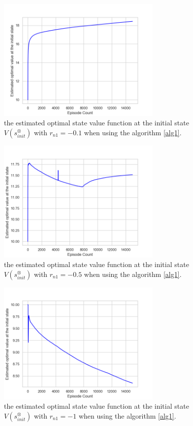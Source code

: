 \documentclass[a4j,12pt,oneside,openany,english,dvipdfmx]{jsbook}
\begin{document}
\begin{figure}[htbp]
   \centering
   \vspace{2mm}
   \includegraphics[width = 8cm]{max_Q_value_TD.png}
   \caption{the estimated optimal state value function at the initial state $V(s^{\otimes}_{init})$ with $r_{n1} = -0.1$ when using the algorithm \ref{alg1}.}
   \label{result1}
\end{figure}

\begin{figure}[htbp]
   \centering
   \vspace{2mm}
   \includegraphics[width = 8cm]{learning_TD_v_15000_5000_rn2_05.png}
   \caption{the estimated optimal state value function at the initial state $V(s^{\otimes}_{init})$ with $r_{n1} = -0.5$ when using the algorithm \ref{alg1}.}
   \label{result1}
\end{figure}

\begin{figure}[htbp]
   \centering
   \vspace{2mm}
   \includegraphics[width = 8cm]{max_Q_value_TD_rn2_1.png}
   \caption{the estimated optimal state value function at the initial state $V(s^{\otimes}_{init})$ with $r_{n1} = -1$ when using the algorithm \ref{alg1}.}
   \label{result1}
\end{figure}
\end{document}
